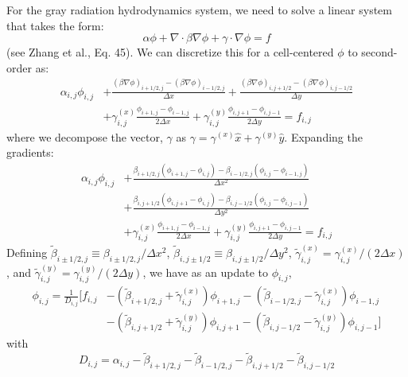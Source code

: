 For the gray radiation hydrodynamics system, we need to solve a
linear system that takes the form:
\begin{equation}
  \alpha \phi + \nabla \cdot \beta \nabla \phi + \gamma \cdot \nabla \phi = f
\end{equation}
(see Zhang et al., Eq. 45). 
We can discretize this for a cell-centered $\phi$ to second-order as:
\begin{align}
  \alpha_{i,j} \phi_{i,j} &+
  \frac{(\beta \nabla \phi)_{i+1/2,j} -
        (\beta \nabla \phi)_{i-1/2,j}}{\Delta x} +
  \frac{(\beta \nabla \phi)_{i,j+1/2} -
        (\beta \nabla \phi)_{i,j-1/2}}{\Delta y} \nonumber \\
  &+
  \gamma^{(x)}_{i,j} \frac{\phi_{i+1,j} - \phi_{i-1,j}}{2\Delta x} +
  \gamma^{(y)}_{i,j} \frac{\phi_{i,j+1} - \phi_{i,j-1}}{2\Delta y} = f_{i,j}
\end{align}
where we decompose the vector, $\gamma$ as $\gamma = \gamma^{(x)}\hat{x} + \gamma^{(y)}\hat{y}$.  Expanding the gradients:
\begin{align}
\label{eq:general_L}
\alpha_{i,j} \phi_{i,j} &+
  \frac{\beta_{i+1/2,j} (\phi_{i+1,j} - \phi_{i,j}) -
        \beta_{i-1/2,j} (\phi_{i,j} - \phi_{i-1,j})}{\Delta x^2} \nonumber \\
 &+
  \frac{\beta_{i,j+1/2} (\phi_{i,j+1} - \phi_{i,j}) -
        \beta_{i,j-1/2} (\phi_{i,j} - \phi_{i,j-1})}{\Delta y^2} \nonumber \\
  &+
  \gamma^{(x)}_{i,j} \frac{\phi_{i+1,j} - \phi_{i-1,j}}{2\Delta x} +
  \gamma^{(y)}_{i,j} \frac{\phi_{i,j+1} - \phi_{i,j-1}}{2\Delta y} = f_{i,j}
\end{align}
Defining $\tilde{\beta}_{i\pm1/2,j} \equiv \beta_{i\pm1/2,j}/\Delta x^2$,
$\tilde{\beta}_{i,j\pm1/2} \equiv \beta_{i,j\pm1/2}/\Delta y^2$,
$\tilde{\gamma}^{(x)}_{i,j} = \gamma^{(x)}_{i,j}/(2\Delta x)$,
and $\tilde{\gamma}^{(y)}_{i,j} = \gamma^{(y)}_{i,j}/(2\Delta y)$, we have
as an update to $\phi_{i,j}$,
\begin{align}
\label{eq:general_mg_smooth}
\phi_{i,j} = \frac{1}{D_{i,j}} \bigg [ f_{i,j}
  &-(\tilde{\beta}_{i+1/2,j} + \tilde{\gamma}^{(x)}_{i,j}) \phi_{i+1,j}
   -(\tilde{\beta}_{i-1/2,j} - \tilde{\gamma}^{(x)}_{i,j}) \phi_{i-1,j}
  \nonumber \\
  &-(\tilde{\beta}_{i,j+1/2} + \tilde{\gamma}^{(y)}_{i,j}) \phi_{i,j+1}
   -(\tilde{\beta}_{i,j-1/2} - \tilde{\gamma}^{(y)}_{i,j}) \phi_{i,j-1}
   \bigg ]
\end{align}
with
\begin{equation}
D_{i,j} = \alpha_{i,j} - \tilde{\beta}_{i+1/2,j} - \tilde{\beta}_{i-1/2,j}
                       - \tilde{\beta}_{i,j+1/2} - \tilde{\beta}_{i,j-1/2}
\end{equation}            

